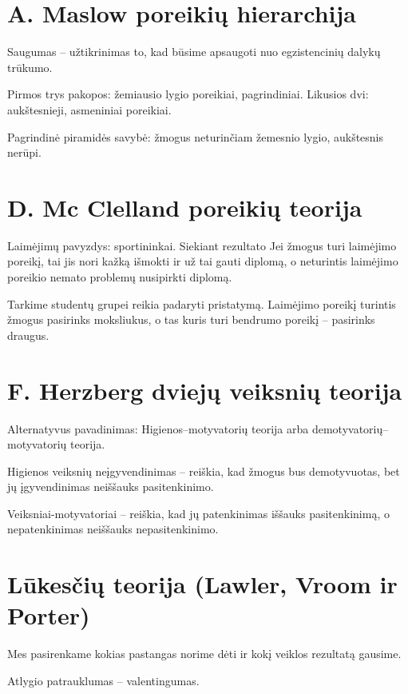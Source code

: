 \section{A. Maslow poreikių hierarchija}

Saugumas – užtikrinimas to, kad būsime apsaugoti nuo egzistencinių
dalykų trūkumo.

Pirmos trys pakopos: žemiausio lygio poreikiai, pagrindiniai.
Likusios dvi: aukštesnieji, asmeniniai poreikiai.

Pagrindinė piramidės savybė: žmogus neturinčiam žemesnio lygio, aukštesnis
nerūpi.

\section{D. Mc Clelland poreikių teorija}

Laimėjimų pavyzdys: sportininkai. Siekiant rezultato 
Jei žmogus turi laimėjimo poreikį, tai jis nori kažką išmokti ir už
tai gauti diplomą, o neturintis laimėjimo poreikio nemato problemų
nusipirkti diplomą.

\begin{exmp}
  Tarkime studentų grupei reikia padaryti pristatymą. Laimėjimo poreikį
  turintis žmogus pasirinks moksliukus, o tas kuris turi bendrumo
  poreikį – pasirinks draugus.
\end{exmp}

\section{F. Herzberg dviejų veiksnių teorija}

Alternatyvus pavadinimas: Higienos–motyvatorių teorija arba demotyvatorių–
motyvatorių teorija.

Higienos veiksnių neįgyvendinimas – reiškia, kad žmogus bus demotyvuotas, 
bet jų įgyvendinimas neiššauks pasitenkinimo.

Veiksniai-motyvatoriai – reiškia, kad jų patenkinimas iššauks pasitenkinimą,
o nepatenkinimas neiššauks nepasitenkinimo.

\section{Lūkesčių teorija (Lawler, Vroom ir Porter)}

Mes pasirenkame kokias pastangas norime dėti ir kokį veiklos rezultatą
gausime.

Atlygio patrauklumas – valentingumas.


